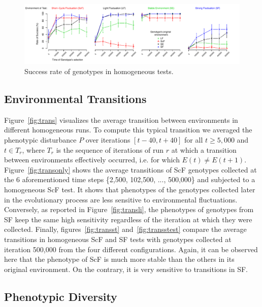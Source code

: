 \begin{figure}[t]
\centering
\includegraphics[width=2\columnwidth]{img/testSurvivingRates}
\caption{Success rate of genotypes in homogeneous tests.}
\label{fig:survrate}
\end{figure}

\subsection{Environmental Transitions}

Figure~\ref{fig:trans} visualizes the average transition between environments in different homogeneous runs. To compute this typical transition we averaged the phenotypic disturbance $P$ over iterations $[t-40, t+40]$ for all $t \ge 5,000$ and $t \in T_r$, where $T_r$ is the sequence of iterations of run $r$ at which a transition between environments effectively occurred, i.e. for which $E(t) \ne E(t+1)$. Figure~\ref{fig:transonly} shows the average transitions of ScF genotypes collected at the 6 aforementioned time steps \{2,500, 102,500, ..., 500,000\} and subjected to a homogeneous ScF test. It shows that phenotypes of the genotypes collected later in the evolutionary process are less sensitive to environmental fluctuations. Conversely, as reported in Figure~\ref{fig:transli}, the phenotypes of genotypes from SF keep the same high sensitivity regardless of the iteration at which they were collected. Finally, figures~\ref{fig:transst} and~\ref{fig:transstest} compare the average transitions in homogeneous ScF and SF tests with genotypes collected at iteration 500,000 from the four different configurations. Again, it can be observed here that the phenotype of ScF is much more stable than the others in its original environment. On the contrary, it is very sensitive to transitions in SF.

\subsection{Phenotypic Diversity} 

